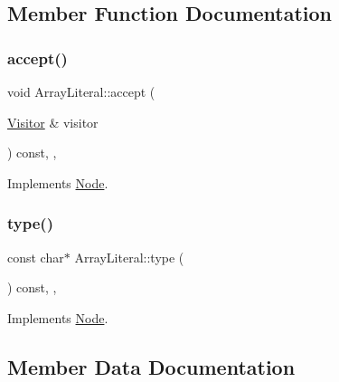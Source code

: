 \subsection{Member Function Documentation}
\mbox{\label{struct_array_literal_ab3ba06d627e0fe714aafb9fc843c83e8}} 
\subsubsection{\texorpdfstring{accept()}{accept()}}
{\footnotesize\ttfamily void Array\+Literal\+::accept (\begin{DoxyParamCaption}\item[{\hyperlink{struct_visitor}{Visitor} \&}]{visitor }\end{DoxyParamCaption}) const\hspace{0.3cm}{\ttfamily [inline]}, {\ttfamily [override]}, {\ttfamily [virtual]}}



Implements \hyperlink{struct_node_a10bd7af968140bbf5fa461298a969c71}{Node}.

\mbox{\label{struct_array_literal_a24964c1f68d796d071b830b605046f51}} 
\subsubsection{\texorpdfstring{type()}{type()}}
{\footnotesize\ttfamily const char$\ast$ Array\+Literal\+::type (\begin{DoxyParamCaption}{ }\end{DoxyParamCaption}) const\hspace{0.3cm}{\ttfamily [inline]}, {\ttfamily [override]}, {\ttfamily [virtual]}}



Implements \hyperlink{struct_node_a82f29420d0a38efcc370352528e94e9b}{Node}.



\subsection{Member Data Documentation}
\mbox{\label{struct_array_literal_ae4c3df364c3994cb8916d73a50f1f92f}} 
